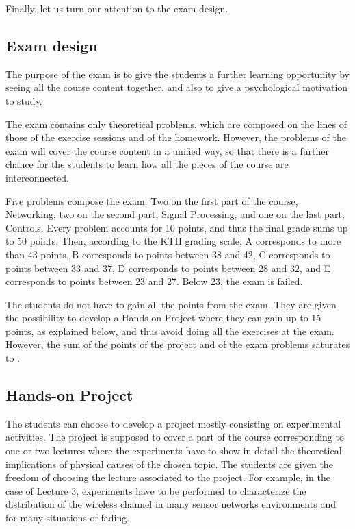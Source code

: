 \documentclass[onecolumn,12pt,draftclsnofoot,a4paper,peerreview]{IEEEtran}
\begin{document}
Finally, let us turn our attention to the exam design. 

\subsection{Exam design} \label{exam design}

The purpose of the exam is to give the students a further learning opportunity by seeing all the course content together, and also to give a psychological motivation to study. 

The exam contains only theoretical problems, which are composed on the lines of those of the exercise sessions and of the homework. However, the problems of the exam will cover the course content in a unified way, so that there is a further chance for the students to learn how all the pieces of the course are interconnected.  

Five problems compose the exam. Two on the first part of the course, Networking, two on the second part, Signal Processing, and one on the last part, Controls. Every problem accounts for 10 points, and thus the final grade sums up to 50 points. Then, according to the KTH grading scale, A corresponds to more than 43 points, B corresponds to points between 38 and 42, C corresponds to points between 33 and 37, D corresponds to points between 28 and 32, and E corresponds to points between 23 and 27. Below 23, the exam is failed.  

The students do not have to gain all the points from the exam. They are given the possibility to develop a Hands-on Project where they can gain up to 15 points, as explained below, and thus avoid doing all the exercises at the exam. However, the sum of the points of the project and of the exam problems saturates to . 

\subsection{Hands-on Project}\label{handsonprojects}

The students can choose to develop a project mostly consisting on experimental activities. The project is supposed to cover a part of the course corresponding to one or two lectures where the experiments have to show in detail the theoretical implications of physical causes of the chosen topic. The students are given the freedom of choosing the lecture associated to the project. For example, in the case of Lecture 3, experiments have to be performed to characterize the distribution of the wireless channel in many sensor networks environments and for many situations of fading. 
\end{document}
